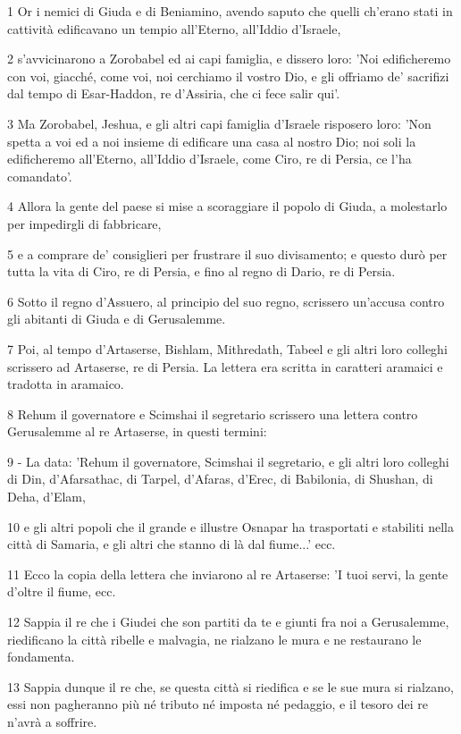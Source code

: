 \par 1 Or i nemici di Giuda e di Beniamino, avendo saputo che quelli ch'erano stati in cattività edificavano un tempio all'Eterno, all'Iddio d'Israele,
\par 2 s'avvicinarono a Zorobabel ed ai capi famiglia, e dissero loro: 'Noi edificheremo con voi, giacché, come voi, noi cerchiamo il vostro Dio, e gli offriamo de' sacrifizi dal tempo di Esar-Haddon, re d'Assiria, che ci fece salir qui'.
\par 3 Ma Zorobabel, Jeshua, e gli altri capi famiglia d'Israele risposero loro: 'Non spetta a voi ed a noi insieme di edificare una casa al nostro Dio; noi soli la edificheremo all'Eterno, all'Iddio d'Israele, come Ciro, re di Persia, ce l'ha comandato'.
\par 4 Allora la gente del paese si mise a scoraggiare il popolo di Giuda, a molestarlo per impedirgli di fabbricare,
\par 5 e a comprare de' consiglieri per frustrare il suo divisamento; e questo durò per tutta la vita di Ciro, re di Persia, e fino al regno di Dario, re di Persia.
\par 6 Sotto il regno d'Assuero, al principio del suo regno, scrissero un'accusa contro gli abitanti di Giuda e di Gerusalemme.
\par 7 Poi, al tempo d'Artaserse, Bishlam, Mithredath, Tabeel e gli altri loro colleghi scrissero ad Artaserse, re di Persia. La lettera era scritta in caratteri aramaici e tradotta in aramaico.
\par 8 Rehum il governatore e Scimshai il segretario scrissero una lettera contro Gerusalemme al re Artaserse, in questi termini:
\par 9 - La data: 'Rehum il governatore, Scimshai il segretario, e gli altri loro colleghi di Din, d'Afarsathac, di Tarpel, d'Afaras, d'Erec, di Babilonia, di Shushan, di Deha, d'Elam,
\par 10 e gli altri popoli che il grande e illustre Osnapar ha trasportati e stabiliti nella città di Samaria, e gli altri che stanno di là dal fiume...' ecc.
\par 11 Ecco la copia della lettera che inviarono al re Artaserse: 'I tuoi servi, la gente d'oltre il fiume, ecc.
\par 12 Sappia il re che i Giudei che son partiti da te e giunti fra noi a Gerusalemme, riedificano la città ribelle e malvagia, ne rialzano le mura e ne restaurano le fondamenta.
\par 13 Sappia dunque il re che, se questa città si riedifica e se le sue mura si rialzano, essi non pagheranno più né tributo né imposta né pedaggio, e il tesoro dei re n'avrà a soffrire.

